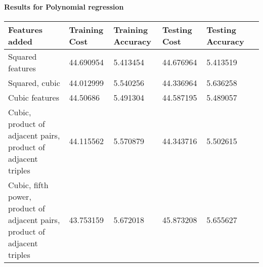 \documentclass[10pt]{article}
\begin{document}
\paragraph{Results for Polynomial regression}
\begin{center}
 \begin{tabular}{|p{}||p{}|p{}|p{}|p{}|p{}|} 
 \hline
Features added & Training Cost & Training Accuracy & Testing Cost & Testing Accuracy\\ [0.5ex] 
 \hline\hline
Squared features & 44.690954 & 5.413454 & 44.676964 & 5.413519\\ 
 \hline
Squared, cubic & 44.012999 & 5.540256 & 44.336964 & 5.636258\\  
 \hline
Cubic features & 44.50686 & 5.491304 & 44.587195 & 5.489057\\ 
 \hline
Cubic, product of adjacent pairs, product of adjacent triples & 44.115562 & 5.570879 & 44.343716 & 5.502615\\ 
 \hline
Cubic, fifth power, product of adjacent pairs, product of adjacent triples & 43.753159 & 5.672018 & 45.873208 & 5.655627\\ 
 \hline
\end{tabular}
\end{center}\\
\end{document}
